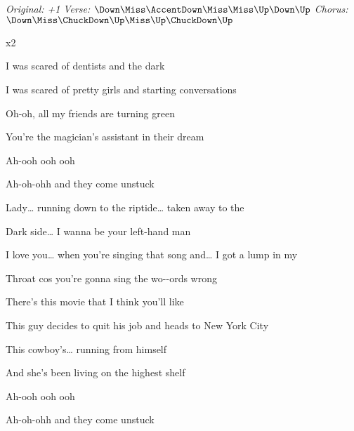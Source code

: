 \begin{song}


\begin{headerbox}
\RaiseBoxWithAccents
\textit{Original: +1} \quad
\textit{Verse:} $\Down\Miss\AccentDown\Miss\Miss\Up\Down\Up$ \quad
\textit{Chorus:} $\Down\Miss\ChuckDown\Up\Miss\Up\ChuckDown\Up$
\end{headerbox}

\begin{hchordbox}
\end{hchordbox}

\bigskip

    x2

\bigskip

I was scared of dentists and the dark \par
{}I was scared of pretty girls and starting conversations \par
Oh-oh, all my friends are turning green \par
You're the magician's assistant in their dream \par
Ah-ooh ooh ooh \par
Ah-oh-ohh  and they come unstuck \par

\bigskip

\begin{chorusbox}{\Chorus}
Lady… running down to the riptide… taken away to the \par
{}Dark side… I wanna be your left-hand man \par
I love you… when you're singing that song and… I got a lump in my \par
{}Throat cos you're gonna sing the wo--ords wrong \par
\end{chorusbox}

\bigskip

There's this movie that I think you'll like \par
This  guy decides to quit his job and heads to New York City \par
This cowboy's… running from himself \par
And she's been living on the highest shelf \par
Ah-ooh ooh ooh \par
Ah-oh-ohh  and they come unstuck \par


\end{song}
